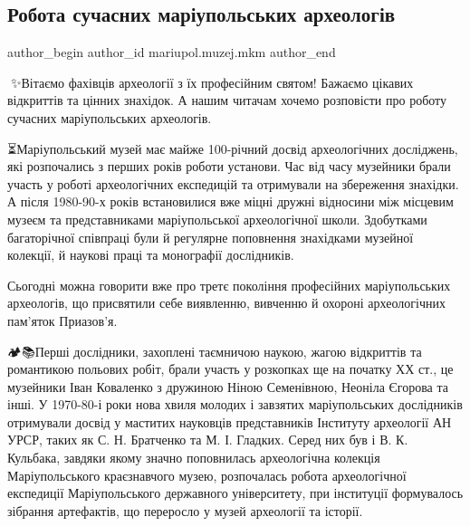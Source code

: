  
 
 
 
 
 
\subsection{Робота сучасних маріупольських археологів}
\label{sec:15_08_2023.fb.mariupol.muzej.mkm.1.robota_suchasnyh_mariupolskih_arheologiv}
 
\ifcmt
 author_begin
   author_id mariupol.muzej.mkm
 author_end
\fi

🎉✨️Вітаємо фахівців археології з їх професійним святом! Бажаємо цікавих
відкриттів та цінних знахідок. А нашим читачам хочемо розповісти про роботу
сучасних маріупольських археологів.

⏳️Маріупольський музей має майже 100-річний досвід археологічних досліджень,
які розпочались з перших років роботи установи. Час від часу музейники брали
участь у роботі археологічних експедицій та отримували на збереження знахідки.
А після 1980-90-х років встановилися вже міцні дружні відносини між місцевим
музеєм та представниками маріупольської археологічної школи. Здобутками
багаторічної співпраці були й регулярне поповнення знахідками музейної
колекції, й наукові праці та монографії дослідників.

Сьогодні можна говорити вже про третє покоління професійних маріупольських
археологів, що присвятили себе виявленню, вивченню й охороні археологічних
пам'яток Приазов'я. 

🏕📚Перші дослідники, захоплені таємничою наукою, жагою відкриттів та
романтикою польових робіт, брали участь у розкопках ще на початку ХХ ст., це
музейники Іван Коваленко з дружиною Ніною Семенівною, Неоніла Єгорова та інші.
У 1970-80-і роки нова хвиля молодих і завзятих маріупольських дослідників
отримували досвід у маститих науковців представників Інституту археології АН
УРСР, таких як С. Н. Братченко та М. І. Гладких. Серед них був і В. К.
Кульбака, завдяки якому значно поповнилась археологічна колекція
Маріупольського краєзнавчого музею, розпочалась робота археологічної експедиції
Маріупольського державного університету, при інституції формувалось зібрання
артефактів, що переросло у музей археології та історії.

